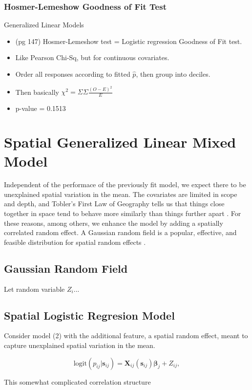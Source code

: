 \documentclass{article}
\begin{document}
\subsubsection{Hosmer-Lemeshow Goodness of Fit Test} %
Generalized Linear Models \citep{Myers2012}

  \begin{itemize} %
  \item (pg 147) Hosmer-Lemeshow test = Logistic regression Goodness of Fit test. 
  \item Like Pearson Chi-Sq, but for continuous covariates. 
  \item Order all responses according to fitted $\hat{p}$, then group into deciles. 
  \item Then basically $\chi^{2} = \Sigma \Sigma \frac{(O - E)^{2}}{E}$
  \item p-value = 0.1513
  \end{itemize}

\section{Spatial Generalized Linear Mixed Model}

Independent of the performace of the previously fit model, we expect there to be unexplained spatial variation in the mean. The covariates are limited in scope and depth, and  Tobler's First Law of Geography tells us that things close together in space tend to behave more similarly than things further apart \citep{Tobler1970}. For these reasons, among others, we enhance the model by adding a spatially correlated random effect. A Gaussian random field is a popular, effective, and feasible distribution for spatial random effects \cite{Gelfand2010}.


\subsection{Gaussian Random Field}

Let random variable $Z_{i}$...

\subsection{Spatial Logistic Regresion Model}

Consider model (2) with the additional feature, a spatial random effect, meant to capture unexplained spatial variation in the mean.

\begin{equation}
\text{logit}(p_{ij}|\pmb{s}_{ij}) = \pmb{X}_{ij}(\pmb{s}_{ij}) \pmb{\beta}_{j} + Z_{ij},
\end{equation}

This somewhat complicated correlation structure 


\end{document}
